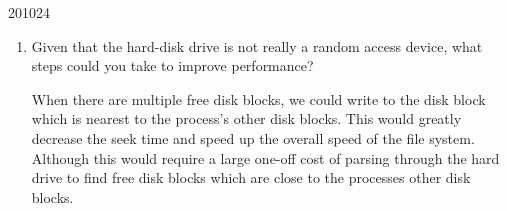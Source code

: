 \documentclass[10pt,\jkfside,a4paper]{article}
\begin{document}
\begin{examquestion}{2010}{2}{4}
\begin{enumerate}
\begin{enumerate}
\item Given that the hard-disk drive is not really a random access device, what
steps could you take to improve performance?

When there are multiple free disk blocks, we could write to the disk block which is nearest 
to the process's other disk blocks. This would greatly decrease the seek time and 
speed up the overall speed of the file system. Although this would require a large one-off 
cost of parsing through the hard drive to find free disk blocks which are close to the 
processes other disk blocks.

\end{enumerate}

\end{enumerate}

\end{examquestion}
\end{document}
